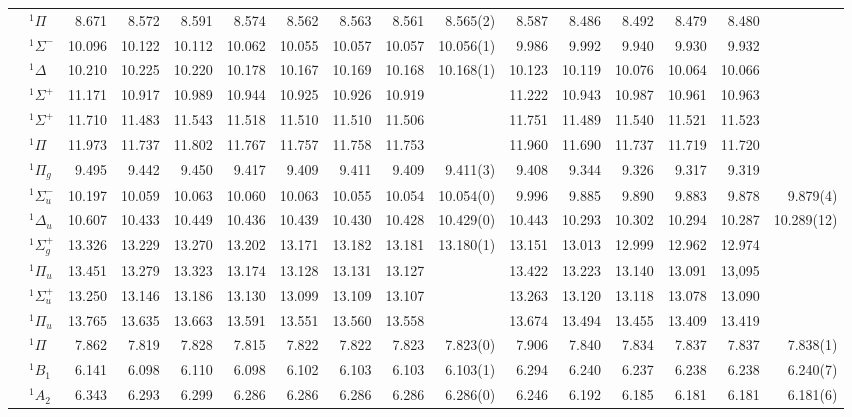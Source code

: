 \documentclass[aip,jcp,reprint,noshowkeys,superscriptaddress]{revtex4-1}
\begin{document}
\begin{squeezetable}
\begin{table}
\begin{ruledtabular}
\begin{tabular}{llrrrrrrrrrrrrrr}
	\ce{CO}		&	$^1\Pi$ 		&8.671	&8.572	&8.591	&8.574	&8.562	&8.563	&8.561	&8.565(2)	&8.587	&8.486	&8.492	&8.479	&8.480	&	\\
				&	$^1\Sigma^-$ 	&10.096	&10.122	&10.112	&10.062	&10.055	&10.057	&10.057	&10.056(1)	&9.986	&9.992	&9.940	&9.930	&9.932	&	\\
				&	$^1\Delta$ 		&10.210	&10.225	&10.220	&10.178	&10.167	&10.169	&10.168	&10.168(1)	&10.123	&10.119	&10.076	&10.064	&10.066	&	\\
				&	$^1\Sigma^+$ 	&11.171	&10.917	&10.989	&10.944	&10.925	&10.926	&10.919	&			&11.222	&10.943	&10.987	&10.961	&10.963	&	\\
				&	$^1\Sigma^+$ 	&11.710	&11.483	&11.543	&11.518	&11.510	&11.510	&11.506	&			&11.751	&11.489	&11.540	&11.521	&11.523	&	\\
				&	$^1\Pi$ 		&11.973	&11.737	&11.802	&11.767	&11.757	&11.758	&11.753	&			&11.960	&11.690	&11.737	&11.719	&11.720	&	\\
	\ce{N2}		&	$^1\Pi_g$  		&9.495	&9.442	&9.450	&9.417	&9.409	&9.411	&9.409	&9.411(3)	&9.408	&9.344	&9.326	&9.317	&9.319	&	\\
				&	$^1\Sigma_u^-$	&10.197	&10.059	&10.063	&10.060	&10.063	&10.055	&10.054	&10.054(0)	&9.996	&9.885	&9.890	&9.883	&9.878	&9.879(4)\\
				&	$^1\Delta_u$ 	&10.607	&10.433	&10.449	&10.436	&10.439	&10.430	&10.428	&10.429(0)	&10.443	&10.293	&10.302	&10.294	&10.287	&10.289(12)\\
				&	$^1\Sigma_g^+$	&13.326	&13.229	&13.270	&13.202	&13.171	&13.182	&13.181	&13.180(1)	&13.151	&13.013	&12.999	&12.962	&12.974	&	\\
				&	$^1\Pi_u$  		&13.451	&13.279	&13.323	&13.174	&13.128	&13.131	&13.127	&			&13.422	&13.223	&13.140	&13.091	&13,095	&	\\
				&	$^1\Sigma_u^+$	&13.250	&13.146	&13.186	&13.130	&13.099	&13.109	&13.107	&			&13.263	&13.120	&13.118	&13.078	&13.090	&	\\
				&	$^1\Pi_u$ 		&13.765	&13.635	&13.663	&13.591	&13.551	&13.560	&13.558	&			&13.674	&13.494	&13.455	&13.409	&13.419\\
	\ce{HCl}	&	$^1\Pi$ 		&7.862	&7.819	&7.828	&7.815	&7.822	&7.822	&7.823	&7.823(0)	&7.906	&7.840	&7.834	&7.837	&7.837	&7.838(1)\\
	\ce{H2S}	&	$^1B_1$  		&6.141	&6.098	&6.110	&6.098	&6.102	&6.103	&6.103	&6.103(1)	&6.294	&6.240	&6.237	&6.238	&6.238	&6.240(7)\\
				&	$^1A_2$  		&6.343	&6.293	&6.299	&6.286	&6.286	&6.286	&6.286	&6.286(0)	&6.246	&6.192	&6.185	&6.181	&6.181	&6.181(6) \\

\end{tabular}
\end{ruledtabular}
\end{table}
\end{squeezetable}
\end{document}
